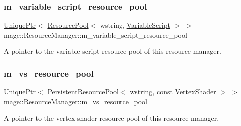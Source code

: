 \subsubsection{\texorpdfstring{m\+\_\+variable\+\_\+script\+\_\+resource\+\_\+pool}{m\_variable\_script\_resource\_pool}}
{\footnotesize\ttfamily \hyperlink{namespacemage_a3316d7143a973e37adf1110f2e80ca31}{Unique\+Ptr}$<$ \hyperlink{classmage_1_1_resource_pool}{Resource\+Pool}$<$ wstring, \hyperlink{classmage_1_1_variable_script}{Variable\+Script} $>$ $>$ mage\+::\+Resource\+Manager\+::m\+\_\+variable\+\_\+script\+\_\+resource\+\_\+pool\hspace{0.3cm}{\ttfamily [private]}}

A pointer to the variable script resource pool of this resource manager. \hypertarget{classmage_1_1_resource_manager_a6f0d2bfba2cbf0586572d100ee06c7f7}{}\label{classmage_1_1_resource_manager_a6f0d2bfba2cbf0586572d100ee06c7f7} 
\subsubsection{\texorpdfstring{m\+\_\+vs\+\_\+resource\+\_\+pool}{m\_vs\_resource\_pool}}
{\footnotesize\ttfamily \hyperlink{namespacemage_a3316d7143a973e37adf1110f2e80ca31}{Unique\+Ptr}$<$ \hyperlink{classmage_1_1_persistent_resource_pool}{Persistent\+Resource\+Pool}$<$ wstring, const \hyperlink{classmage_1_1_vertex_shader}{Vertex\+Shader} $>$ $>$ mage\+::\+Resource\+Manager\+::m\+\_\+vs\+\_\+resource\+\_\+pool\hspace{0.3cm}{\ttfamily [private]}}

A pointer to the vertex shader resource pool of this resource manager. 